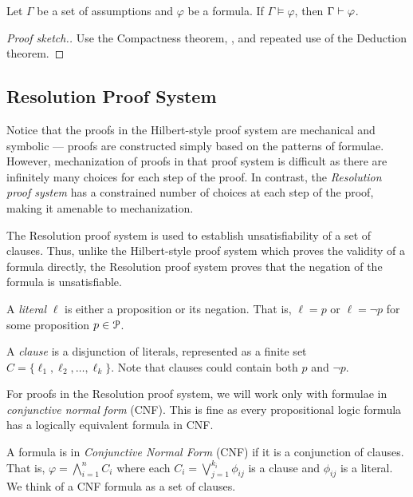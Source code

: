 \documentclass[11pt,usenames, dvipsnames]{article}
\begin{document}
\begin{theorem}
  Let $\Gamma$ be a set of assumptions and $\varphi$ be a formula. If $\Gamma \models \varphi$, then $\Gamma \vdash \varphi$.
\end{theorem}

\begin{proof}[Proof sketch.]
  Use the Compactness theorem, , and repeated use of the Deduction theorem.
\end{proof}


\subsection{\large \centering Resolution Proof System}
\noindent

Notice that the proofs in the Hilbert-style proof system are mechanical and symbolic --- proofs are constructed simply based on the patterns of formulae. However, mechanization of proofs in that proof system is difficult as there are infinitely many choices for each step of the proof. In contrast, the \emph{Resolution proof system} has a constrained number of choices at each step of the proof, making it amenable to mechanization.

The Resolution proof system is used to establish unsatisfiability of a set of clauses. Thus, unlike the Hilbert-style proof system which proves the validity of a formula directly, the Resolution proof system proves that the negation of the formula is unsatisfiable.

\begin{definition}
  A \emph{literal} $\ell$ is either a proposition or its negation. That is, $\ell = p$ or $\ell = \neg p$ for some proposition $p \in \props$.

  A \emph{clause} is a disjunction of literals, represented as a finite set $C = \{\ell_1, \ell_2, \ldots, \ell_k\}$. Note that clauses could contain both $p$ and $\neg p$.
\end{definition}

For proofs in the Resolution proof system, we will work only with formulae in \emph{conjunctive normal form} (CNF). This is fine as every propositional logic formula has a logically equivalent formula in CNF.

\begin{definition}
  A formula is in \emph{Conjunctive Normal Form} (CNF) if it is a conjunction of clauses. That is, $\varphi = \bigwedge_{i=1}^n C_i$ where each $C_i = \bigvee_{j=1}^{k_i} \phi_{ij}$ is a clause and $\phi_{ij}$ is a literal. We think of a CNF formula as a set of clauses.
\end{definition}
\end{document}
